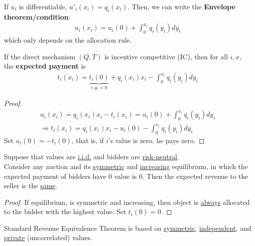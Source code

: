 \documentclass[11pt]{elegantbook}
\begin{document}
If $u_i$ is differentiable, $u'_i(x_i)=q_i(x_i)$. Then, we can write the \textbf{Envelope theorem/condition}:
\begin{equation}
    \begin{aligned}
        u_i(x_i)=u_i(0)+\int_0^{x_i} q_i(y_i)dy_i
    \end{aligned}
    \nonumber
\end{equation}
which only depends on the allocation rule.

\begin{theorem}
    If the direct mechanism $(Q,T)$ is incentive competitive (IC), then for all $i,x$, the \textbf{expected payment} is
    \begin{equation}
        \begin{aligned}
            t_i(x_i)=\underbrace{t_i(0)}_{e.g.=0}+q_i(x_i)x_i-\int_0^{x_i} q_i(y_i)dy_i
        \end{aligned}
        \nonumber
    \end{equation}
\end{theorem}
\begin{proof}
    \begin{equation}
        \begin{aligned}
            u_i(x_i)= q_i(x_i) x_i - t_i(x_i)=u_i(0)+\int_0^{x_i} q_i(y_i)dy_i\\
            \Rightarrow t_i(x_i)=q_i(x_i)x_i-u_i(0)-\int_0^{x_i} q_i(y_i)dy_i
        \end{aligned}
        \nonumber
    \end{equation}
    Set $u_i(0)=-t_i(0)$, that is, if $i$'s value is zero, he pays zero.
\end{proof}

\begin{corollary}
    Suppose that values are \underline{i.i.d.} and bidders are \underline{risk-neutral}.\\
    Consider any auction and its \underline{symmetric} and \underline{increasing} equilibrium, in which the expected payment of bidders have $0$ value is $0$. Then the expected revenue to the seller is the \underline{same}.
\end{corollary}
\begin{proof}
    If equilibrium, is symmetric and increasing, then object is \underline{always} allocated to the bidder with the highest value. Set $t_i(0)=0$.
\end{proof}

Standard Revenue Equivalence Theorem is based on \underline{symmetric}, \underline{independent}, and \underline{private} (uncorrelated) values.
\end{document}
